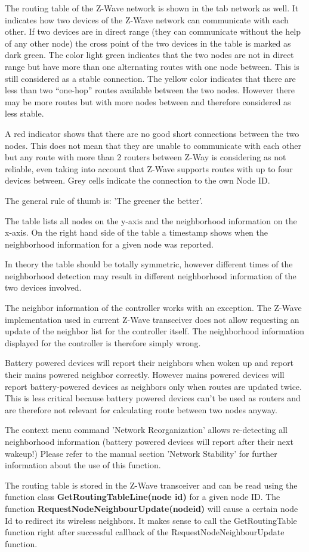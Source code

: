 The routing table of the Z-Wave network is shown in the tab network as well. It indicates how two devices of the Z-Wave network can communicate with each other. 
If two devices are in direct range (they can communicate without the help of any other node) the cross point of the two devices in the table is marked as dark green. 
The color light green indicates that the two nodes are not in direct range but have more than one alternating routes with one node between. This is still considered 
as a stable connection.
The yellow color indicates that there are less than two “one-hop” routes available between the two nodes. However there may be more routes but with more nodes
 between and therefore considered as less stable.

A red indicator shows that there are no good short connections between the two nodes. This does not mean that they are unable to communicate with each other 
 but any route with more than 2 routers between Z-Way is considering as not reliable, even taking into account that Z-Wave supports routes with up to four devices 
 between. Grey cells indicate the connection to the own Node ID. 

The general rule of thumb is: 'The greener the better'.
 
The table lists all nodes on the y-axis and the neighborhood information on the x-axis. On the right hand side of the table a timestamp shows when the neighborhood
 information for a given node was reported.   

In theory the table should be totally symmetric, however different times of the neighborhood detection may result in different neighborhood information of the 
two devices involved.
 
The neighbor information of the controller works with an exception. The Z-Wave implementation used in current Z-Wave transceiver does not allow requesting an 
update of the neighbor list for the controller itself. The neighborhood information displayed for the controller is therefore simply wrong.

Battery powered devices will report their neighbors when woken up and report their mains powered neighbor correctly. However mains powered devices will report 
battery-powered devices as neighbors only when routes are updated twice. This is less critical because battery powered devices can’t be used as routers and are 
therefore not relevant for calculating route between two nodes anyway. 
 
The context menu command 'Network Reorganization' allows re-detecting all neighborhood information (battery powered devices will report after their next wakeup!) 
Please refer to the manual section 'Network Stability' for further information about the use of this function.

The routing table is stored in the Z-Wave transceiver and can be read using the function class {\bf  GetRoutingTableLine(node id)} for a given node ID. The function 
{\bf RequestNodeNeighbourUpdate(nodeid)} will cause a certain node Id to redirect its
 wireless neighbors. It makes sense to call the GetRoutingTable function right 
after successful callback of the RequestNodeNeighbourUpdate function. 

 